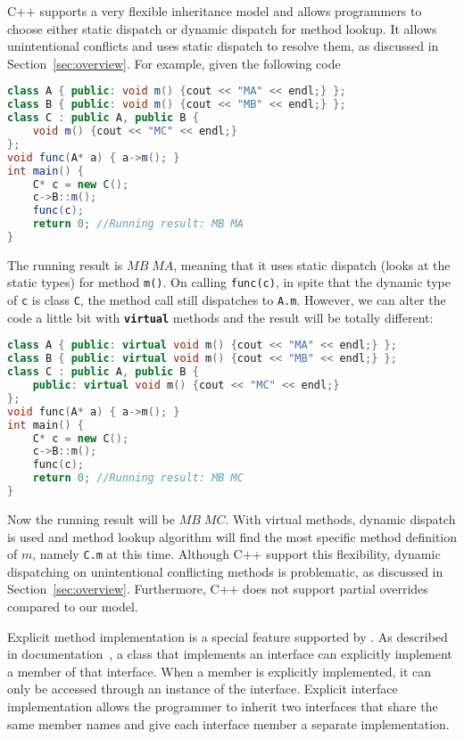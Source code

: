 C++ supports a very flexible inheritance model and allows programmers to choose either static dispatch or dynamic dispatch for method lookup.
It allows unintentional conflicts and uses static dispatch to resolve them, as discussed in Section~\ref{sec:overview}. For example, given the following code
\begin{lstlisting}[language=Java]
class A { public: void m() {cout << "MA" << endl;} };
class B { public: void m() {cout << "MB" << endl;} };
class C : public A, public B { 
	void m() {cout << "MC" << endl;}
};
void func(A* a) { a->m(); }
int main() {
	C* c = new C();
	c->B::m();
	func(c); 
	return 0; //Running result: MB MA
}
\end{lstlisting}
The running result is $MB \; MA$, meaning that it uses static dispatch (looks at the static types) for method \lstinline|m()|. 
On calling \texttt{func(c)}, in spite that the dynamic type of \texttt{c} is class \texttt{C}, the method call still dispatches to 
\lstinline|A.m|.
However, we can alter the code a little bit with \textbf{\texttt{virtual}} methods and the result will be totally different:
\begin{lstlisting}[language=c++]
class A { public: virtual void m() {cout << "MA" << endl;} };
class B { public: virtual void m() {cout << "MB" << endl;} };
class C : public A, public B { 
    public: virtual void m() {cout << "MC" << endl;}
};
void func(A* a) { a->m(); }
int main() {
	C* c = new C();
	c->B::m();
	func(c); 
	return 0; //Running result: MB MC
}
\end{lstlisting}
Now the running result will be $MB \; MC$. With virtual methods, dynamic dispatch is used and 
method lookup algorithm will find the most specific method definition of $m$, namely \lstinline|C.m| at this time.
Although C++ support this flexibility, dynamic dispatching on
unintentional conflicting methods is problematic, as discussed in Section~\ref{sec:overview}.
Furthermore, C++ does not support partial overrides compared to our
model.

Explicit method implementation is a special feature supported by
\csharp{}. As described in \csharp{} documentation~\cite{csharpdoc}, a
class that implements an interface can explicitly implement a member
of that interface. When a member is explicitly implemented, it can
only be accessed through an instance of the interface. Explicit
interface implementation allows the programmer to inherit two
interfaces that share the same member names and give each interface
member a separate implementation.

